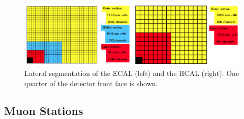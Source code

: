 \begin{figure}
    \centering
    \includegraphics[width=\textwidth]{figures/CAL_system.png}
    \caption{Lateral segmentation of the ECAL (left) and the HCAL (right). One quarter of the detector front face is shown.}
    \label{fig:cal_system}
\end{figure}
\subsection{Muon Stations}

